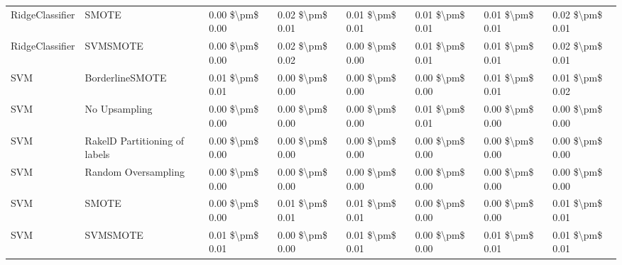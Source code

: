 \begin{tabular}{llllllll}
                RidgeClassifier &                         SMOTE & 0.00 \$\textbackslash pm\$ 0.00 &           0.02 \$\textbackslash pm\$ 0.01 &       0.01 \$\textbackslash pm\$ 0.01 &        0.01 \$\textbackslash pm\$ 0.01 &                         0.01 \$\textbackslash pm\$ 0.01 &     0.02 \$\textbackslash pm\$ 0.01 \\
                RidgeClassifier &                      SVMSMOTE & 0.00 \$\textbackslash pm\$ 0.00 &           0.02 \$\textbackslash pm\$ 0.02 &       0.00 \$\textbackslash pm\$ 0.00 &        0.01 \$\textbackslash pm\$ 0.01 &                         0.01 \$\textbackslash pm\$ 0.01 &     0.02 \$\textbackslash pm\$ 0.01 \\
                            SVM &               BorderlineSMOTE & 0.01 \$\textbackslash pm\$ 0.01 &           0.00 \$\textbackslash pm\$ 0.00 &       0.00 \$\textbackslash pm\$ 0.00 &        0.00 \$\textbackslash pm\$ 0.00 &                         0.01 \$\textbackslash pm\$ 0.01 &     0.01 \$\textbackslash pm\$ 0.02 \\
                            SVM &                 No Upsampling & 0.00 \$\textbackslash pm\$ 0.00 &           0.00 \$\textbackslash pm\$ 0.00 &       0.00 \$\textbackslash pm\$ 0.00 &        0.01 \$\textbackslash pm\$ 0.01 &                         0.00 \$\textbackslash pm\$ 0.00 &     0.00 \$\textbackslash pm\$ 0.00 \\
                            SVM & RakelD Partitioning of labels & 0.00 \$\textbackslash pm\$ 0.00 &           0.00 \$\textbackslash pm\$ 0.00 &       0.00 \$\textbackslash pm\$ 0.00 &        0.00 \$\textbackslash pm\$ 0.00 &                         0.00 \$\textbackslash pm\$ 0.00 &     0.00 \$\textbackslash pm\$ 0.00 \\
                            SVM &           Random Oversampling & 0.00 \$\textbackslash pm\$ 0.00 &           0.00 \$\textbackslash pm\$ 0.00 &       0.00 \$\textbackslash pm\$ 0.00 &        0.00 \$\textbackslash pm\$ 0.00 &                         0.00 \$\textbackslash pm\$ 0.00 &     0.00 \$\textbackslash pm\$ 0.00 \\
                            SVM &                         SMOTE & 0.00 \$\textbackslash pm\$ 0.00 &           0.01 \$\textbackslash pm\$ 0.01 &       0.01 \$\textbackslash pm\$ 0.01 &        0.00 \$\textbackslash pm\$ 0.00 &                         0.00 \$\textbackslash pm\$ 0.00 &     0.01 \$\textbackslash pm\$ 0.01 \\
                            SVM &                      SVMSMOTE & 0.01 \$\textbackslash pm\$ 0.01 &           0.00 \$\textbackslash pm\$ 0.00 &       0.01 \$\textbackslash pm\$ 0.01 &        0.00 \$\textbackslash pm\$ 0.00 &                         0.01 \$\textbackslash pm\$ 0.01 &     0.01 \$\textbackslash pm\$ 0.01 \\

\end{tabular}
